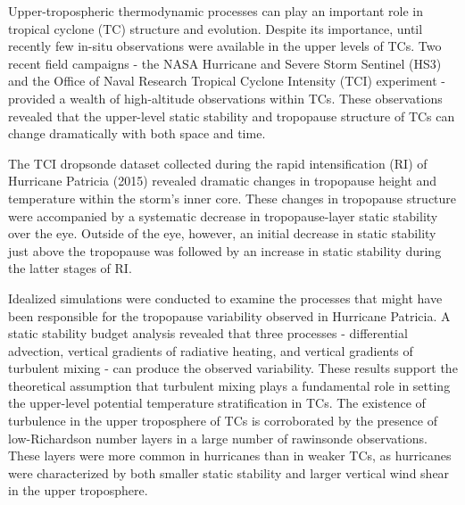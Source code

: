 


\indent \indent Upper-tropospheric thermodynamic processes can play an important role in tropical cyclone (TC) structure and evolution.
Despite its importance, until recently few in-situ observations were available in the upper levels of TCs.
Two recent field campaigns - the NASA Hurricane and Severe Storm Sentinel (HS3) and the Office of Naval Research Tropical Cyclone Intensity (TCI) experiment - provided a wealth of high-altitude observations within TCs.
These observations revealed that the upper-level static stability and tropopause structure of TCs can change dramatically with both space and time.

The TCI dropsonde dataset collected during the rapid intensification (RI) of Hurricane Patricia (2015) revealed dramatic changes in tropopause height and temperature within the storm's inner core.
These changes in tropopause structure were accompanied by a systematic decrease in tropopause-layer static stability over the eye.
Outside of the eye, however, an initial decrease in static stability just above the tropopause was followed by an increase in static stability during the latter stages of RI.

Idealized simulations were conducted to examine the processes that might have been responsible for the tropopause variability observed in Hurricane Patricia.
A static stability budget analysis revealed that three processes - differential advection, vertical gradients of radiative heating, and vertical gradients of turbulent mixing - can produce the observed variability.
These results support the theoretical assumption that turbulent mixing plays a fundamental role in setting the upper-level potential temperature stratification in TCs.
The existence of turbulence in the upper troposphere of TCs is corroborated by the presence of low-Richardson number layers in a large number of rawinsonde observations.
These layers were more common in hurricanes than in weaker TCs, as hurricanes were characterized by both smaller static stability and larger vertical wind shear in the upper troposphere.

